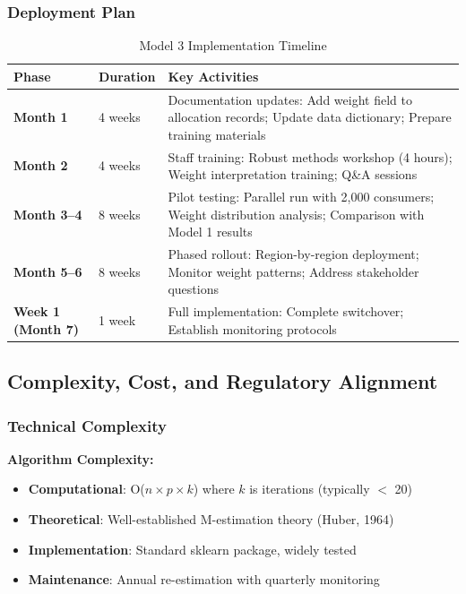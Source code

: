\subsubsection{Deployment Plan}

\begin{table}[h]
\centering
\caption{Model 3 Implementation Timeline}
\begin{tabular}{llp{8cm}}
\toprule
\textbf{Phase} & \textbf{Duration} & \textbf{Key Activities} \\
\midrule
\textbf{Month 1} & 4 weeks & Documentation updates: Add weight field to allocation records; Update data dictionary; Prepare training materials \\
\textbf{Month 2} & 4 weeks & Staff training: Robust methods workshop (4 hours); Weight interpretation training; Q\&A sessions \\
\textbf{Month 3--4} & 8 weeks & Pilot testing: Parallel run with 2,000 consumers; Weight distribution analysis; Comparison with Model 1 results \\
\textbf{Month 5--6} & 8 weeks & Phased rollout: Region-by-region deployment; Monitor weight patterns; Address stakeholder questions \\
\textbf{Week 1 (Month 7)} & 1 week & Full implementation: Complete switchover; Establish monitoring protocols \\
\bottomrule
\end{tabular}
\end{table}

\subsection{Complexity, Cost, and Regulatory Alignment}

\subsubsection{Technical Complexity}

\textbf{Algorithm Complexity:}
\begin{itemize}
    \item \textbf{Computational}: O($n \times p \times k$) where $k$ is iterations (typically $<$ 20)
    \item \textbf{Theoretical}: Well-established M-estimation theory (Huber, 1964)
    \item \textbf{Implementation}: Standard sklearn package, widely tested
    \item \textbf{Maintenance}: Annual re-estimation with quarterly monitoring
\end{itemize}

